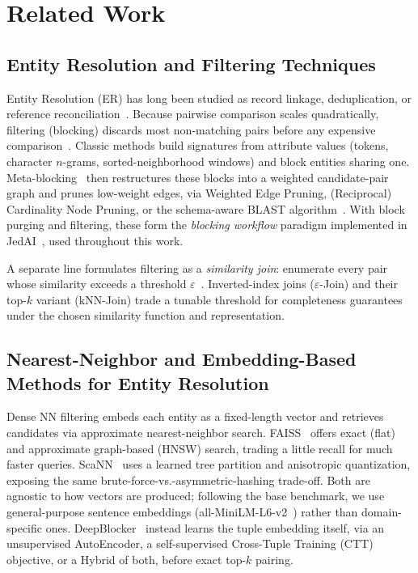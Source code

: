 \documentclass[runningheads]{llncs}
\begin{document}
\section{Related Work}

\subsection{Entity Resolution and Filtering Techniques}
Entity Resolution (ER) has long been studied as record linkage, deduplication, or reference
reconciliation~\cite{christen2012datamatching}. Because pairwise comparison scales
quadratically, filtering (blocking) discards most non-matching pairs before any expensive
comparison~\cite{papadakis2021survey}. Classic methods build signatures from attribute values (tokens, character $n$-grams, sorted-neighborhood windows) and block entities sharing one. Meta-blocking~\cite{papadakis2014metablocking} then restructures these blocks into a weighted candidate-pair graph and prunes low-weight edges, via Weighted Edge Pruning, (Reciprocal) Cardinality Node Pruning, or the schema-aware BLAST algorithm~\cite{simonini2016blast}. With block purging and filtering, these form the \textit{blocking workflow} paradigm implemented in JedAI~\cite{papadakis2020jedai}, used throughout this work.

A separate line formulates filtering as a \textit{similarity join}: enumerate every pair whose similarity exceeds a threshold $\varepsilon$~\cite{mann2016setsimjoin}. Inverted-index joins ($\varepsilon$-Join) and their top-$k$ variant (kNN-Join) trade a tunable threshold for completeness guarantees under the chosen similarity function and representation.

\subsection{Nearest-Neighbor and Embedding-Based Methods for Entity Resolution}

Dense NN filtering embeds each entity as a fixed-length vector and retrieves candidates via
approximate nearest-neighbor search. FAISS~\cite{johnson2021billion} offers exact (flat) and
approximate graph-based (HNSW) search, trading a little recall for much faster queries.
ScaNN~\cite{guo2020scann} uses a learned tree partition and anisotropic quantization, exposing
the same brute-force-vs.-asymmetric-hashing trade-off. Both are agnostic to how vectors are
produced; following the base benchmark, we use general-purpose sentence embeddings
(all-MiniLM-L6-v2~\cite{reimers2019sentencebert}) rather than domain-specific ones.
DeepBlocker~\cite{thirumuruganathan2021deep} instead learns the tuple embedding itself, via an
unsupervised AutoEncoder, a self-supervised Cross-Tuple Training (CTT) objective, or a Hybrid
of both, before exact top-$k$ pairing.
\end{document}
